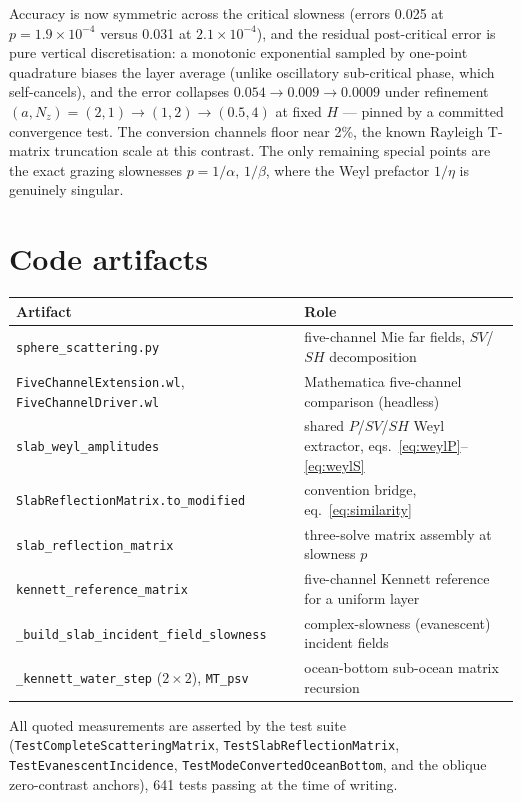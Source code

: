 \documentclass[11pt,a4paper]{article}
\newcommand{\code}[1]{\texttt{#1}}
\begin{document}
Accuracy is now symmetric across the critical slowness (errors 0.025 at
$p = 1.9\times 10^{-4}$ versus 0.031 at $2.1\times 10^{-4}$), and the
residual post-critical error is pure vertical discretisation: a
monotonic exponential sampled by one-point quadrature biases the layer
average (unlike oscillatory sub-critical phase, which self-cancels), and
the error collapses $0.054 \to 0.009 \to 0.0009$ under refinement
$(a, N_z) = (2,1) \to (1,2) \to (0.5,4)$ at fixed $H$ --- pinned by a
committed convergence test.  The conversion channels floor near 2\%,
the known Rayleigh T-matrix truncation scale at this contrast.  The only
remaining special points are the exact grazing slownesses
$p = 1/\alpha,\, 1/\beta$, where the Weyl prefactor $1/\eta$ is
genuinely singular.

\section{Code artifacts}
\label{sec:code}

\begin{center}
\small
\begin{tabular}{ll}
\toprule
Artifact & Role \\
\midrule
\code{sphere\_scattering.py} &
  five-channel Mie far fields, $SV$/$SH$ decomposition \\
\code{FiveChannelExtension.wl}, \code{FiveChannelDriver.wl} &
  Mathematica five-channel comparison (headless) \\
\code{slab\_weyl\_amplitudes} &
  shared $P$/$SV$/$SH$ Weyl extractor, eqs.~\eqref{eq:weylP}--\eqref{eq:weylS} \\
\code{SlabReflectionMatrix.to\_modified} &
  convention bridge, eq.~\eqref{eq:similarity} \\
\code{slab\_reflection\_matrix} &
  three-solve matrix assembly at slowness $p$ \\
\code{kennett\_reference\_matrix} &
  five-channel Kennett reference for a uniform layer \\
\code{\_build\_slab\_incident\_field\_slowness} &
  complex-slowness (evanescent) incident fields \\
\code{\_kennett\_water\_step} ($2\times 2$), \code{MT\_psv} &
  ocean-bottom sub-ocean matrix recursion \\
\bottomrule
\end{tabular}
\end{center}

All quoted measurements are asserted by the test suite
(\code{TestCompleteScatteringMatrix}, \code{TestSlabReflectionMatrix},
\code{TestEvanescentIncidence}, \code{TestModeConvertedOceanBottom},
and the oblique zero-contrast anchors), 641 tests passing at the time of
writing.
\end{document}
